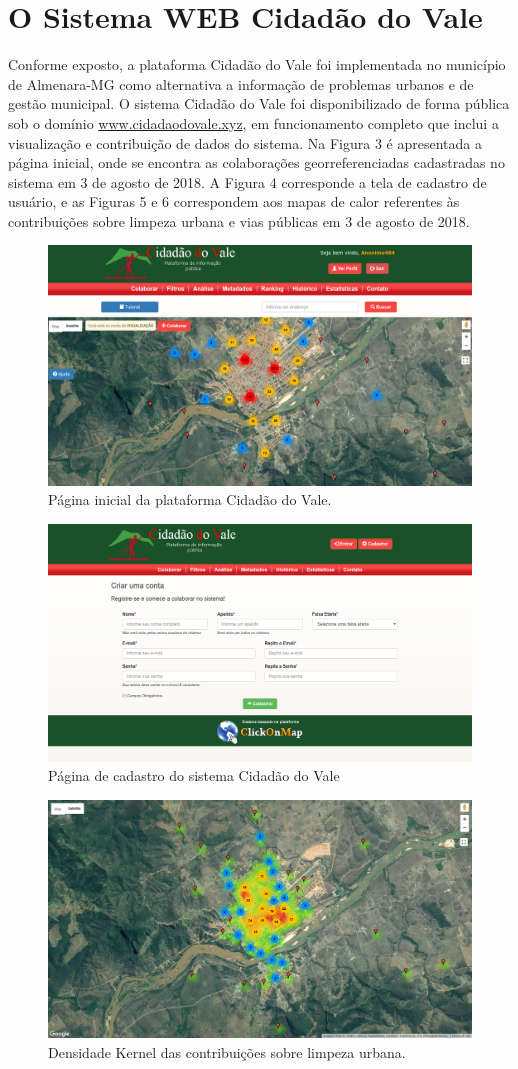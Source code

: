 \section{O Sistema WEB Cidadão do Vale}
Conforme exposto, a plataforma Cidadão do Vale foi implementada no município de Almenara-MG como alternativa a informação de problemas urbanos e de gestão municipal. O sistema Cidadão do Vale foi disponibilizado de forma pública sob o domínio \url{www.cidadaodovale.xyz}, em funcionamento completo que inclui a visualização e contribuição de dados do sistema. Na Figura 3 é apresentada a página inicial, onde se encontra as colaborações georreferenciadas cadastradas no sistema em 3 de agosto de 2018. A Figura 4 corresponde a tela de cadastro de usuário, e as Figuras 5 e 6 correspondem aos mapas de calor referentes às contribuições sobre limpeza urbana e vias públicas em 3 de agosto de 2018.

\begin{figure}[H]
	\centering
	\caption{Página inicial da plataforma Cidadão do Vale.}
	\includegraphics[width=0.6\linewidth]{Imagens/01}
\end{figure}

\begin{figure}[H]
	\centering
	\caption{Página de cadastro do sistema Cidadão do Vale}	
	\includegraphics[width=0.6\linewidth]{Imagens/02}
\end{figure}

\begin{figure}[H]
	\centering
	\caption{Densidade Kernel das contribuições sobre limpeza urbana.}
	\includegraphics[width=0.6\linewidth]{Imagens/03}
\end{figure}

